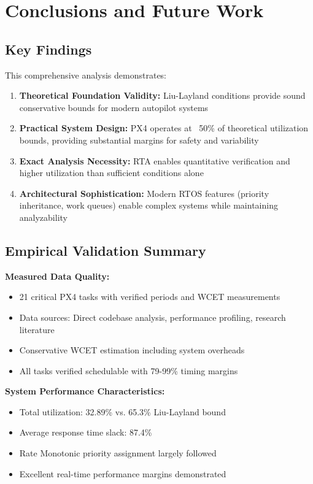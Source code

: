 \documentclass[12pt,a4paper]{article}
\begin{document}
\section{Conclusions and Future Work}

\subsection{Key Findings}

This comprehensive analysis demonstrates:

\begin{enumerate}
\item \textbf{Theoretical Foundation Validity:} Liu-Layland conditions provide sound conservative bounds for modern autopilot systems

\item \textbf{Practical System Design:} PX4 operates at ~50\% of theoretical utilization bounds, providing substantial margins for safety and variability

\item \textbf{Exact Analysis Necessity:} RTA enables quantitative verification and higher utilization than sufficient conditions alone

\item \textbf{Architectural Sophistication:} Modern RTOS features (priority inheritance, work queues) enable complex systems while maintaining analyzability
\end{enumerate}

\subsection{Empirical Validation Summary}

\textbf{Measured Data Quality:}
\begin{itemize}
\item 21 critical PX4 tasks with verified periods and WCET measurements
\item Data sources: Direct codebase analysis, performance profiling, research literature
\item Conservative WCET estimation including system overheads
\item All tasks verified schedulable with 79-99\% timing margins
\end{itemize}

\textbf{System Performance Characteristics:}
\begin{itemize}
\item Total utilization: 32.89\% vs. 65.3\% Liu-Layland bound
\item Average response time slack: 87.4\%
\item Rate Monotonic priority assignment largely followed
\item Excellent real-time performance margins demonstrated
\end{itemize}
\end{document}
